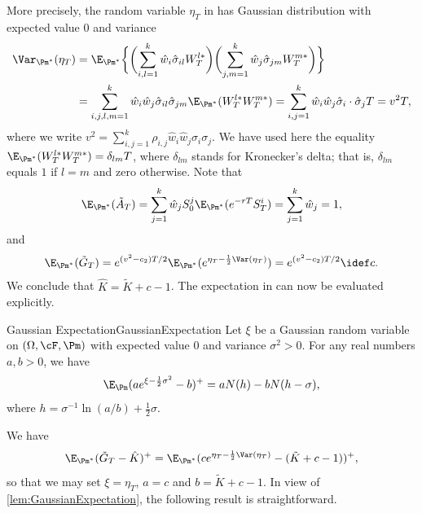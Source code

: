 More precisely, the random variable \(\eta_T\) in  has Gaussian distribution with expected value \(0\) and variance
\begin{align*}
	\Var_{\Pm^*} (\eta_T) & = \E_{\Pm^*} \biggl\{ \biggl( \sum_{i,l=1}^k \hat{w}_i \hat{\sigma}_{il} W_T^{l*} \biggr) \biggl( \sum_{j,m=1}^k \hat{w}_j \hat{\sigma}_{jm} W_T^{m*} \biggr) \biggr\}                          \\
	                      & = \sum_{i,j,l,m=1}^k \hat{w}_i \hat{w}_j \hat{\sigma}_{il} \hat{\sigma}_{jm} \E_{\Pm^*} (W_T^{l*} W_T^{m*}) = \sum_{i,j=1}^k \hat{w}_i \hat{w}_j \hat{\sigma}_i \cdot \hat{\sigma}_j T = v^2 T,
\end{align*}
where we write \(v^2 = \sum_{i,j=1}^k \rho_{i,j} \hat{w}_i \hat{w}_j \sigma_i \sigma_j\). We have used here the equality \(\E_{\Pm^*} (W_T^{l*} W_T^{m*}) = \delta_{lm} T\), where \(\delta_{lm}\) stands for Kronecker's delta; that is, \(\delta_{lm}\) equals \(1\) if \(l = m\) and zero otherwise. Note that
\[
	\E_{\Pm^*} (\tilde{A}_T) = \sum_{j=1}^k \hat{w}_j S_0^j \E_{\Pm^*} (e^{-rT} S_T^i) = \sum_{j=1}^k \hat{w}_j = 1,
\]
and
\[
	\E_{\Pm^*} (\tilde{G}_T) = e^{(v^2 - c_2) T / 2} \E_{\Pm^*} (e^{\eta_T - \frac{1}{2} \Var(\eta_T)}) = e^{(v^2 - c_2) T / 2} \idef c.
\]
We conclude that \(\hat{K} = \tilde{K} + c - 1\). The expectation in  can now be evaluated explicitly.

\begin{lem}{Gaussian Expectation}{GaussianExpectation}
	Let \(\xi\) be a Gaussian random variable on \((\Omega, \cF, \Pm)\) with expected value \(0\) and variance \(\sigma^2 > 0\). For any real numbers \(a, b > 0\), we have
	\begin{equation} \label{eq:GaussianExpectationFormula}
		\E_{\Pm} (a e^{\xi - \frac{1}{2} \sigma^2} - b)^+ = a N(h) - b N(h - \sigma),
	\end{equation}
	where \(h = \sigma^{-1} \ln(a/b) + \frac{1}{2} \sigma\).
\end{lem}

We have
\[
	\E_{\Pm^*} (\tilde{G}_T - \hat{K})^+ = \E_{\Pm^*} (c e^{\eta_T - \frac{1}{2} \Var(\eta_T)} - (\tilde{K} + c - 1))^+,
\]
so that we may set \(\xi = \eta_T\), \(a = c\) and \(b = \tilde{K} + c - 1\). In view of \cref{lem:GaussianExpectation}, the following result is straightforward.

